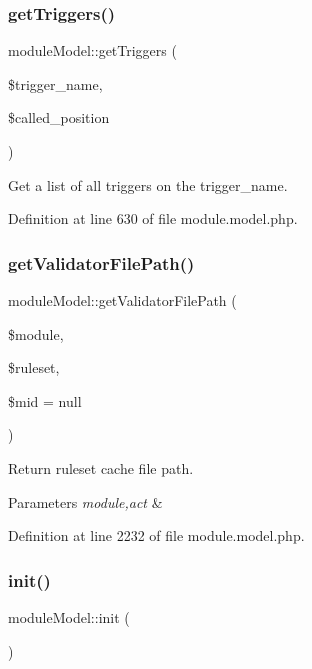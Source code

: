 \subsubsection{\texorpdfstring{get\+Triggers()}{getTriggers()}}
{\footnotesize\ttfamily module\+Model\+::get\+Triggers (\begin{DoxyParamCaption}\item[{}]{\$trigger\+\_\+name,  }\item[{}]{\$called\+\_\+position }\end{DoxyParamCaption})}



Get a list of all triggers on the trigger\+\_\+name. 



Definition at line 630 of file module.\+model.\+php.

\mbox{\label{classmoduleModel_a240b4774ddaadc1ded08551120942ca3}} 
\subsubsection{\texorpdfstring{get\+Validator\+File\+Path()}{getValidatorFilePath()}}
{\footnotesize\ttfamily module\+Model\+::get\+Validator\+File\+Path (\begin{DoxyParamCaption}\item[{}]{\$module,  }\item[{}]{\$ruleset,  }\item[{}]{\$mid = {\ttfamily null} }\end{DoxyParamCaption})}



Return ruleset cache file path. 


\begin{DoxyParams}{Parameters}
{\em module,act} & \\
\hline
\end{DoxyParams}


Definition at line 2232 of file module.\+model.\+php.

\mbox{\label{classmoduleModel_a1d6fb4cdd3dd5e068e71cacc551f517c}} 
\subsubsection{\texorpdfstring{init()}{init()}}
{\footnotesize\ttfamily module\+Model\+::init (\begin{DoxyParamCaption}{ }\end{DoxyParamCaption})}



